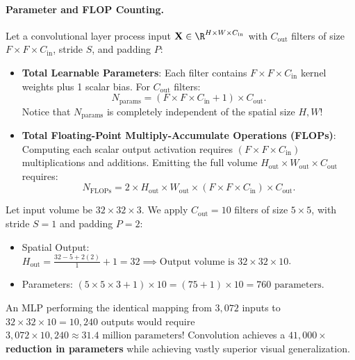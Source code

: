 \paragraph{Parameter and FLOP Counting.}
Let a convolutional layer process input $\mathbf{X} \in \R^{H \times W \times C_{\text{in}}}$ with $C_{\text{out}}$ filters of size $F \times F \times C_{\text{in}}$, stride $S$, and padding $P$:
\begin{itemize}
  \item \textbf{Total Learnable Parameters}: Each filter contains $F \times F \times C_{\text{in}}$ kernel weights plus 1 scalar bias. For $C_{\text{out}}$ filters:
    \begin{equation}
    N_{\text{params}} = \left( F \times F \times C_{\text{in}} + 1 \right) \times C_{\text{out}}.
    \label{eq:conv_param_count}
    \end{equation}
    Notice that $N_{\text{params}}$ is completely independent of the spatial size $H, W$!
  \item \textbf{Total Floating-Point Multiply-Accumulate Operations (FLOPs)}: Computing each scalar output activation requires $(F \times F \times C_{\text{in}})$ multiplications and additions. Emitting the full volume $H_{\text{out}} \times W_{\text{out}} \times C_{\text{out}}$ requires:
    \begin{equation}
    N_{\text{FLOPs}} = 2 \times H_{\text{out}} \times W_{\text{out}} \times \left( F \times F \times C_{\text{in}} \right) \times C_{\text{out}}.
    \label{eq:conv_flops_count}
    \end{equation}
\end{itemize}

\begin{example}
Let input volume be $32 \times 32 \times 3$. We apply $C_{\text{out}} = 10$ filters of size $5 \times 5$, with stride $S = 1$ and padding $P = 2$:
\begin{itemize}[noitemsep]
  \item Spatial Output: $H_{\text{out}} = \frac{32 - 5 + 2(2)}{1} + 1 = 32 \implies \text{Output volume is } 32 \times 32 \times 10$.
  \item Parameters: $(5 \times 5 \times 3 + 1) \times 10 = (75 + 1) \times 10 = 760 \text{ parameters}$.
\end{itemize}
An MLP performing the identical mapping from $3,072$ inputs to $32 \times 32 \times 10 = 10,240$ outputs would require $3,072 \times 10,240 \approx 31.4 \text{ million parameters}$! Convolution achieves a \textbf{$41,000\times$ reduction in parameters} while achieving vastly superior visual generalization.
\end{example}

